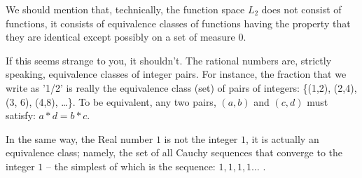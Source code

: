 \documentclass{article}
\begin{document}
We should mention that, technically, the function space $L_2$ does not 
consist of functions, it consists of 
equivalence classes of functions having the property
that they are identical except possibly on a set of measure $0$.

If this seems strange to you, it shouldn't. The rational numbers are, strictly 
speaking, equivalence classes of integer pairs.
For instance, the fraction that we write as '1/2' is really the 
equivalence class (set) of pairs of integers: 
\{(1,2), (2,4), (3, 6), (4,8), \ldots \}.
To be equivalent, any two pairs, $(a, b)$ and $(c, d)$ must satisfy: 
$a * d = b * c$.

In the same way, the Real number $1$ is not the integer $1$, it is actually an equivalence 
class; namely, the set of all Cauchy sequences that converge to the integer 
$1$ -- the simplest of which is the sequence: $1, 1, 1, 1\ldots$ .
\end{document}

